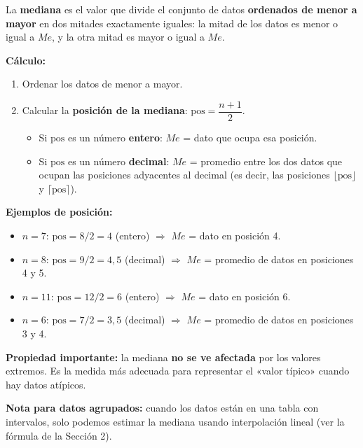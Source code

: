 \documentclass[11pt, letterpaper]{article}
\begin{document}
\begin{tcolorbox}[importantbox, title={Mediana $Me$}]
La \textbf{mediana} es el valor que divide el conjunto de datos \textbf{ordenados de menor a mayor} en dos mitades exactamente iguales: la mitad de los datos es menor o igual a $Me$, y la otra mitad es mayor o igual a $Me$.

\medskip

\textbf{Cálculo:}
\begin{enumerate}[label=\arabic*.]
  \item Ordenar los datos de menor a mayor.
  \item Calcular la \textbf{posición de la mediana}: $\text{pos} = \dfrac{n+1}{2}$.
  \begin{itemize}
    \item Si $\text{pos}$ es un número \textbf{entero}: $Me$ = dato que ocupa esa posición.
    \item Si $\text{pos}$ es un número \textbf{decimal}: $Me$ = promedio entre los dos datos que ocupan las posiciones adyacentes al decimal (es decir, las posiciones $\lfloor\text{pos}\rfloor$ y $\lceil\text{pos}\rceil$).
  \end{itemize}
\end{enumerate}

\medskip

\textbf{Ejemplos de posición:}
\begin{itemize}
  \item $n=7$: $\text{pos} = 8/2 = 4$ (entero) $\Rightarrow$ $Me$ = dato en posición 4.
  \item $n=8$: $\text{pos} = 9/2 = 4{,}5$ (decimal) $\Rightarrow$ $Me$ = promedio de datos en posiciones 4 y 5.
  \item $n=11$: $\text{pos} = 12/2 = 6$ (entero) $\Rightarrow$ $Me$ = dato en posición 6.
  \item $n=6$: $\text{pos} = 7/2 = 3{,}5$ (decimal) $\Rightarrow$ $Me$ = promedio de datos en posiciones 3 y 4.
\end{itemize}

\medskip

\textbf{Propiedad importante:} la mediana \textbf{no se ve afectada} por los valores extremos. Es la medida más adecuada para representar el «valor típico» cuando hay datos atípicos.

\medskip

\textbf{Nota para datos agrupados:} cuando los datos están en una tabla con intervalos, solo podemos estimar la mediana usando interpolación lineal (ver la fórmula de la Sección 2).
\end{tcolorbox}
\end{document}
